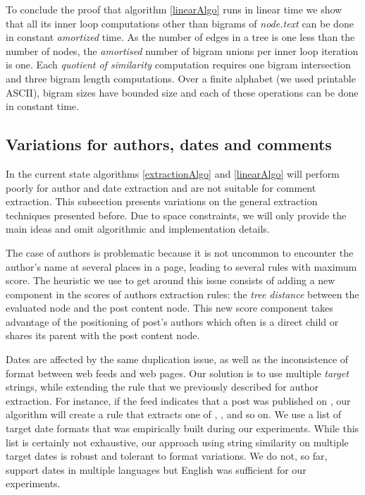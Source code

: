 \linearAlgo

To conclude the proof that algorithm \ref{linearAlgo} runs in linear time we show that all its inner loop computations other than bigrams of \emph{node.text} can be done in constant \emph{amortized} time. As the number of edges in a tree is one less than the number of nodes, the \emph{amortised} number of bigram unions per inner loop iteration is one. Each \emph{quotient of similarity} computation requires one bigram intersection and three bigram length computations. Over a finite alphabet (we used printable ASCII), bigram sizes have bounded size and each of these operations can be done in constant time.

\subsection{Variations for authors, dates and comments}
In the current state algorithms \ref{extractionAlgo} and \ref{linearAlgo} will perform poorly for author and date extraction and are not suitable for comment extraction. This subsection presents variations on the general extraction techniques presented before. Due to space constraints, we will only provide the main ideas and omit algorithmic and implementation details.

The case of authors is problematic because it is not uncommon to encounter the author's name at several places in a page, leading to several rules with maximum score. The heuristic we use to get around this issue consists of adding a new component in the scores of authors extraction rules: the \emph{tree distance} between the evaluated node and the post content node. This new score component takes advantage of the positioning of post's authors which often is a direct child or shares its parent with the post content node.

Dates are affected by the same duplication issue, as well as the inconsistence of format between web feeds and web pages. Our solution is to use multiple \emph{target} strings, while extending the rule that we previously described for author extraction. For instance, if the feed indicates that a post was published on
, our algorithm will create a rule that extracts one of , ,  and so on. We use a list of  target date formats that was empirically built during our experiments. While this list is certainly not exhaustive, our approach using string similarity on multiple target dates is robust and tolerant to format variations. We do not, so far, support dates in multiple languages but English was sufficient for our experiments.


